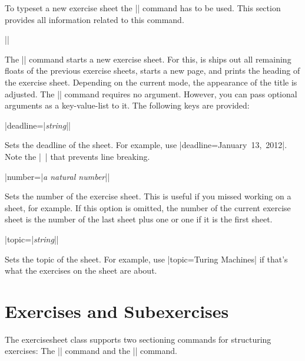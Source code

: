 \documentclass[a4paper,fleqn]{report}
\def\exercisesheet{{exercisesheet}}
\def\syntaxdefaultarg#1{\hfill\texttt{\small #1}\par\smallskip\noindent\ignorespaces}
\def\metaargument#1{\textit{\small #1}}
\begin{document}
To typeset a new exercise sheet the |\sheet| command has to be used.
This section provides all information related to this command.

\begin{syntax}
  |\sheet[|\metaargument{key-value-list}|]| \syntaxdefaultarg{} The
  |\sheet| command starts a new exercise sheet. For this, is ships out
  all remaining floats of the previous exercise sheets, starts a new
  page, and prints the heading of the exercise sheet. Depending on the
  current mode, the appearance of the title is adjusted. The |\sheet|
  command requires no argument. However, you can pass optional
  arguments as a key-value-list to it. The following keys are
  provided:
  \begin{syntax}
    |deadline={|\metaargument{string}|}| \syntaxdefaultarg{}
    Sets the deadline of the sheet. For example, use 
    |deadline={January~13,~2012}|. Note the |~| that prevents line
    breaking.
  \end{syntax}
  \begin{syntax}
    |number={|\metaargument{a natural number}|}| \syntaxdefaultarg{}
    Sets the number of the exercise sheet. This is useful if you
    missed working on a sheet, for example. If this option is omitted,
    the number of the current exercise sheet is the number of the last
    sheet plus one or one if it is the first sheet.
  \end{syntax}
  \begin{syntax}
    |topic={|\metaargument{string}|}| \syntaxdefaultarg{}
    Sets the topic of the sheet. For example, use 
    |topic={Turing Machines}| if that's what the exercises on the
    sheet are about.
  \end{syntax}
\end{syntax}


\section{Exercises and Subexercises}

The \exercisesheet{} class supports two sectioning commands for
structuring exercises: The |\exercise| command and the |\subexercise|
command.
\end{document}
